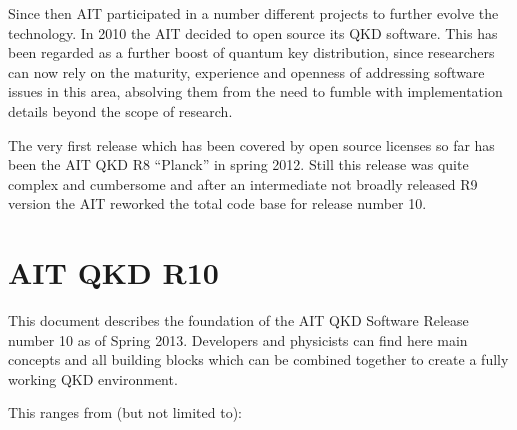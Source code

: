 \medskip

Since then AIT participated in a number different projects to further evolve the technology. In 2010 the AIT decided to open source its QKD software. This has been regarded as a further boost of quantum key distribution, since researchers can now rely on the maturity, experience and openness of addressing software issues in this area, absolving them from the need to fumble with implementation details beyond the scope of research.

\medskip

The very first release which has been covered by open source licenses so far has been the AIT QKD R8 ``Planck'' in spring 2012. Still this release was quite complex and cumbersome and after an intermediate not broadly released R9 version the AIT reworked the total code base for release number 10.

\section{AIT QKD R10}
\label{sec:AIT QKD R10}

This document describes the foundation of the AIT QKD Software Release number 10 as of Spring 2013. Developers and physicists can find here main concepts and all building blocks which can be combined together to create a fully working QKD environment.

\medskip

This ranges from (but not limited to):

